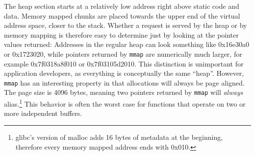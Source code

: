 \documentclass[prodmode,acmtaco]{acmsmall}
\begin{document}
The heap section starts at a relatively low address right above static code and data.
Memory mapped chunks are placed towards the upper end of the virtual address space, closer to the stack.
Whether a request is served by the heap or by memory mapping is therefore easy to determine just by looking at the pointer values returned:
Addresses in the regular heap can look something like 0x16e30a0 or 0x1723020, while pointers returned by \texttt{mmap} are numerically much larger, for example 0x7f0318a8f010 or 0x7f03105d2010.
This distinction is unimportant for application developers, as everything is conceptually the same ``heap''.
However, \texttt{mmap} has an interesting property in that allocations will always be page aligned.
The page size is 4096 bytes, meaning two pointers returned by \texttt{mmap} will \emph{always} alias.\footnote{glibc's version of malloc adds 16 bytes of metadata at the beginning, therefore every memory mapped address ends with 0x010.}
This behavior is often the worst case for functions that operate on two or more independent buffers.
\end{document}
